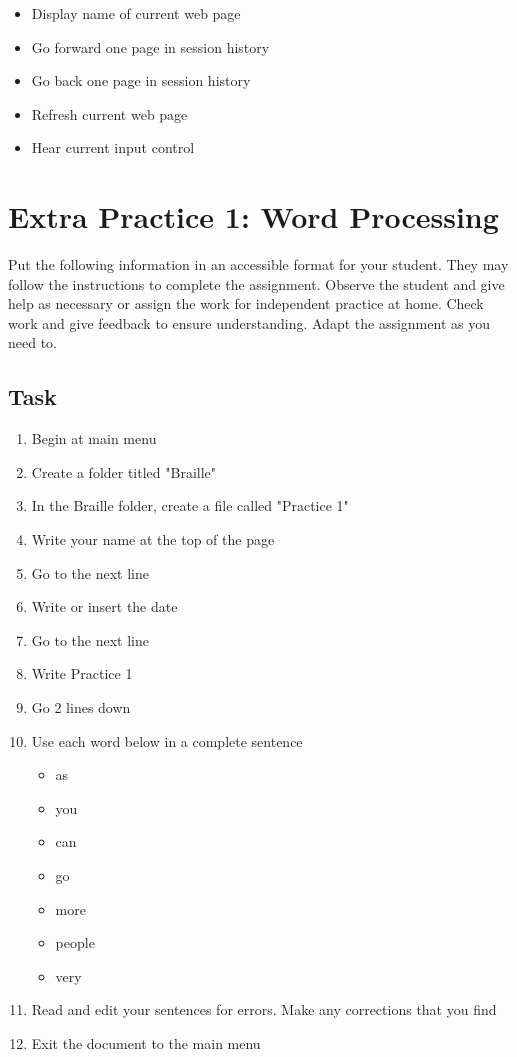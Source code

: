 \documentclass[10pt,letterpaper,twoside]{report}
\begin{document}
{\begin{enumerate}
\begin{itemize}
		      \item Display name of current web page 
		      \item Go forward one page in session history 
		      \item Go back one page in session history 
		      \item Refresh current web page 
		      \item Hear current input control 
	      \end{itemize}
\end{enumerate}

\clearpage
\section{Extra Practice 1: Word Processing }
Put the following information in an accessible format for your student. They may follow the instructions to complete the assignment. Observe the student and give help as necessary or assign the work for independent practice at home. Check work and give feedback to ensure understanding. Adapt the assignment as you need to.
\subsection{Task}
\begin{enumerate}
	\item Begin at main menu
	\item Create a folder titled "Braille"
	\item In the Braille folder, create a file called "Practice 1"
	\item Write your name at the top of the page
	\item Go to the next line
	\item Write or insert the date
	\item Go to the next line
	\item Write Practice 1
	\item Go 2 lines down
	\item Use each word below in a complete sentence
	      \begin{itemize}
		      \item as
		      \item you
		      \item can
		      \item go
		      \item more
		      \item people
		      \item very
	      \end{itemize}
	\item Read and edit your sentences for errors. Make any corrections that you find
	\item Exit the document to the main menu
\end{enumerate}

}
\end{document}
